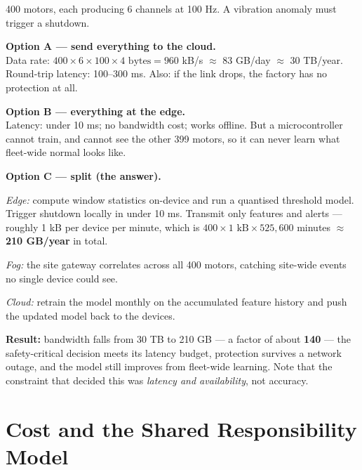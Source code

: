 \begin{worked}
400 motors, each producing 6 channels at 100 Hz. A vibration anomaly must trigger a
shutdown.

\smallskip
\textbf{Option A --- send everything to the cloud.}\\
Data rate: $400 \times 6 \times 100 \times 4\text{ bytes} = 960$ kB/s $\approx$
83 GB/day $\approx$ 30 TB/year. Round-trip latency: 100--300 ms. Also: if the link
drops, the factory has no protection at all.

\textbf{Option B --- everything at the edge.}\\
Latency: under 10 ms; no bandwidth cost; works offline. But a microcontroller
cannot train, and cannot see the other 399 motors, so it can never learn what
fleet-wide normal looks like.

\textbf{Option C --- split (the answer).}
\begin{tight}
  \item \emph{Edge:} compute window statistics on-device and run a quantised
        threshold model. Trigger shutdown locally in under 10 ms. Transmit only
        features and alerts --- roughly 1 kB per device per minute, which is
        $400 \times 1\text{ kB} \times 525{,}600$ minutes $\approx$
        \textbf{210 GB/year} in total.
  \item \emph{Fog:} the site gateway correlates across all 400 motors, catching
        site-wide events no single device could see.
  \item \emph{Cloud:} retrain the model monthly on the accumulated feature history
        and push the updated model back to the devices.
\end{tight}

\smallskip
\textbf{Result:} bandwidth falls from 30 TB to 210 GB --- a factor of about
\textbf{140} --- the safety-critical
decision meets its latency budget, protection survives a network outage, and the
model still improves from fleet-wide learning. Note that the constraint that decided
this was \emph{latency and availability}, not accuracy.
\end{worked}

\section{Cost and the Shared Responsibility Model}

